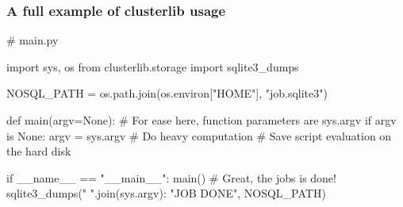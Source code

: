 \documentclass[11pt,compress,serif]{beamer}
\begin{document}
%    
%    
%    

\begin{frame}[fragile=singleslide]
    \frametitle{A full example of clusterlib usage}
    

\begin{pythoncode}
# main.py

import sys, os
from clusterlib.storage import sqlite3_dumps

NOSQL_PATH = os.path.join(os.environ["HOME"], "job.sqlite3")

def main(argv=None):
    # For ease here, function parameters are sys.argv
    if argv is None: 
        argv = sys.argv  
    # Do heavy computation
    # Save script evaluation on the hard disk

if __name__ == "__main__":
    main()
    # Great, the jobs is done!
    sqlite3_dumps({" ".join(sys.argv): "JOB DONE"}, NOSQL_PATH)
\end{pythoncode}

\end{frame}
\end{document}
